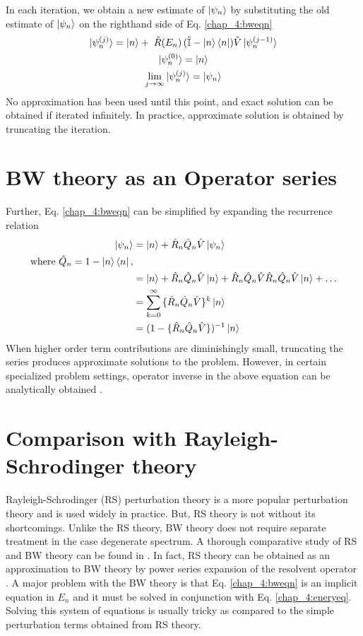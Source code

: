 In each iteration, we obtain a new estimate of $\ket{\psi_n}$ by substituting the old estimate of $\ket{\psi_n}$ on the righthand side of Eq. \eqref{chap_4:bweqn}
\begin{gather}
  \label{chap_4:itereq} \ket{\psi_{n}^{(j)}} = \ket{n} + \; \hat{R}(E_{n})\,(\hat{\mathbb{I}} - \ket{n}\bra{n})\hat{V}\ket{\psi_{n}^{(j-1)}} \\
  \ket{\psi_{n}^{(0)}} = \ket{n} \nonumber \\
  \lim_{j\rightarrow \infty} \ket{\psi_{n}^{(j)}} = \ket{\psi_n} \nonumber
\end{gather} No approximation has been used until this point, and exact solution can be obtained if iterated infinitely. 
In practice, approximate solution is obtained by truncating the iteration.

\section{BW theory as an Operator series}
Further, Eq. \eqref{chap_4:bweqn} can be simplified by expanding the recurrence relation
\begin{align}
 \ket{\psi_n} &= \ket{n} + \hat{R}_{n}\hat{Q}_{n}\hat{V}\ket{\psi_n} \nonumber\\
 \text{where } \hat{Q}_{n} = \mathrm{1} - \ket{n}\bra{n}, \nonumber\\
 &= \ket{n} + \hat{R}_{n}\hat{Q}_{n}\hat{V}\ket{n} + \hat{R}_{n}\hat{Q}_{n}\hat{V}\hat{R}_{n}\hat{Q}_{n}\hat{V}\ket{n} + \dots \nonumber\\
 &= \sum_{k=0}^{\infty}{\{\hat{R}_{n}\hat{Q}_{n}\hat{V}\}^k \ket{n}} \nonumber\\ 
 &= (\mathrm{1} - \{\hat{R}_{n}\hat{Q}_{n}\hat{V}\})^{-1} \ket{n}
\end{align}
When higher order term contributions are diminishingly small, truncating the series produces approximate solutions 
to the problem. However, in certain specialized problem settings, operator inverse in the above equation can be analytically obtained \cite{silvert1972comparison}.

\section{Comparison with Rayleigh-Schrodinger theory}
Rayleigh-Schrodinger (RS) perturbation theory is a more popular perturbation theory and is used widely in practice. But, RS theory is not without its shortcomings. 
Unlike the RS theory, BW theory does not require separate treatment in the case degenerate spectrum. A thorough comparative study of RS and BW theory can be found in \parencite{silvert1972comparison}. 
In fact, RS theory can be obtained as an approximation to BW theory by power series expansion of the resolvent operator \cite{wilson2009brillouin}. A major problem with
the BW theory is that Eq. \eqref{chap_4:bweqn} is an implicit equation in $E_n$ and it must be solved in conjunction with Eq. \eqref{chap_4:eneryeq}. Solving this system of
equations is usually tricky as compared to the simple perturbation terms obtained from RS theory.

